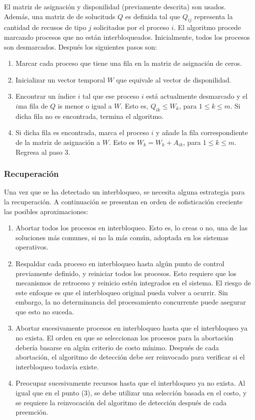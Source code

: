 \documentclass[12pt, a4paper]{article} %
\begin{document}
El matriz de asignación y disponilidad (previamente descrita) son usados. Además, una matriz de de solucituds $Q$ es definida tal que $Q_{ij}$ representa la cantidad de recusos de tipo $j$ solicitados por el proceso $i$. El algoritmo procede marcando procesos que no están interbloqueados. Inicialmente, todos los procesos son desmarcados. Después los siguientes pasos son:

\begin{enumerate}
	\item Marcar cada proceso que tiene una fila en la matriz de asignación de ceros.
	\item Inicializar un vector temporal $W$ que equivale al vector de disponilidad.
	\item Encontrar un índice $i$ tal que ese proceso $i$ está actualmente desmarcado y el $i$ma fila de $Q$ is menor o igual a $W$. Esto es, $Q_{ik} \leq W_k$, para $1 \leq k \leq m$. Si dicha fila no es encontrada, termina el algoritmo.
	\item Si dicha fila es encontrada, marca el proceso $i$ y añade la fila correspondiente de la matriz de asignación a $W$. Esto es $W_k = W_k + A_{ik}$, para $1 \leq k \leq m$. Regresa al paso 3.
\end{enumerate}

\subsubsection{Recuperación}

Una vez que se ha detectado un interbloqueo, se necesita alguna estrategia para la recuperación. A continuación se presentan en orden de sofisticación creciente las posibles aproximaciones:

\begin{enumerate}
	\item Abortar todos los procesos en interbloqueo. Esto es, lo creas o no, una de las soluciones más comunes, si no la más común, adoptada en los sistemas operativos.
	\item Respaldar cada proceso en interbloqueo hasta algún punto de control previamente definido, y reiniciar todos los procesos. Esto requiere que los mecanismos de retroceso y reinicio estén integrados en el sistema. El riesgo de este enfoque es que el interbloqueo original pueda volver a ocurrir. Sin embargo, la no determinancia del procesamiento concurrente puede asegurar que esto no suceda.
	\item Abortar sucesivamente procesos en interbloqueo hasta que el interbloqueo ya no exista. El orden en que se seleccionan los procesos para la abortación debería basarse en algún criterio de costo mínimo. Después de cada abortación, el algoritmo de detección debe ser reinvocado para verificar si el interbloqueo todavía existe.
	\item Preocupar sucesivamente recursos hasta que el interbloqueo ya no exista. Al igual que en el punto (3), se debe utilizar una selección basada en el costo, y se requiere la reinvocación del algoritmo de detección después de cada preemción. 
\end{enumerate}
\end{document}
